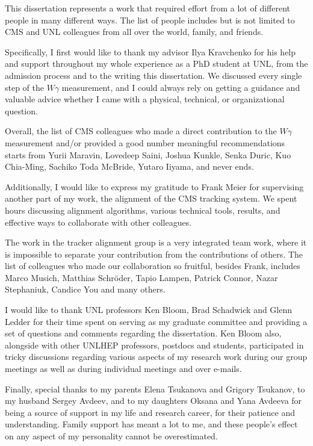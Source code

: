 \begin{acknowledgments}

This dissertation represents a work that required effort from a lot of different people in many different ways. The list of people includes but is not limited to CMS and UNL colleagues from all over the world, family, and friends.

Specifically, I first would like to thank my advisor Ilya Kravchenko for his help and support throughout my whole experience as a PhD student at UNL, from the admission process and to the writing this dissertation. We discussed every single step of the $W\gamma$ measurement, and I could always rely on getting a guidance and valuable advice whether I came with a physical, technical, or organizational question. 

Overall, the list of CMS colleagues who made a direct contribution to the $W\gamma$ measurement and/or provided a good number meaningful recommendations starts from Yurii Maravin, Lovedeep Saini, Joshua Kunkle, Senka Duric, Kuo Chia-Ming, Sachiko Toda McBride, Yutaro Iiyama, and never ends. 

Additionally,  I would like to express my gratitude to Frank Meier for supervising another part of my work, the alignment of the CMS tracking system. We spent hours discussing alignment algorithms, various technical tools, results, and effective ways to collaborate with other colleagues. 

The work in the tracker alignment group is a very integrated team work, where it is impossible to separate your contribution from the contributions of others. The list of colleagues who made our collaboration so fruitful, besides Frank, includes Marco Musich, Matthias Schr\"{o}der, Tapio Lampen, Patrick Connor, Nazar Stephaniuk, Candice You and many others. 

I would like to thank UNL professors Ken Bloom, Brad Schadwick and Glenn Ledder for their time spent on serving as my graduate committee and providing a set of questions and comments regarding the dissertation. Ken Bloom also, alongside with other UNLHEP professors, postdocs and students, participated in tricky discussions regarding various aspects of my research work during our group meetings as well as during individual meetings and over e-mails. 

Finally, special thanks to my parents Elena Tsukanova and Grigory Tsukanov, to my husband Sergey Avdeev, and to my daughters Oksana and Yana Avdeeva for being a source of support in my life and research career, for their patience and understanding. Family support has meant a lot to me, and these people's effect on any aspect of my personality cannot be overestimated.



\end{acknowledgments}
